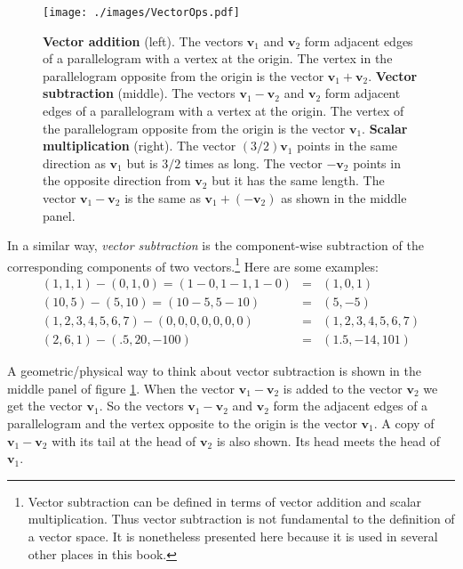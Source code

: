 \begin{figure}[h]
\centering
\texttt{[image: ./images/VectorOps.pdf]}
\caption[Scott Hotton]{{\bf Vector addition} (left). The vectors $\mathbf{v}_1$ 
and $\mathbf{v}_2$ form adjacent edges of a parallelogram with a vertex at the
origin. The vertex in the parallelogram opposite from the origin is the 
vector $\mathbf{v}_1 + \mathbf{v}_2$. {\bf Vector subtraction} (middle). The 
vectors $\mathbf{v}_1 - \mathbf{v}_2$ and $\mathbf{v}_2$ form adjacent edges of
a parallelogram with a vertex at the origin. The vertex of the parallelogram 
opposite from the origin is the vector $\mathbf{v}_1$. {\bf Scalar 
multiplication} (right). The vector $(3/2)\mathbf{v}_1$ points in the same
direction as $\mathbf{v}_1$ but is $3/2$ times as long. The vector 
$-\mathbf{v}_2$ points in the opposite direction from $\mathbf{v}_2$ but
it has the same length. The vector $\mathbf{v}_1 - \mathbf{v}_2$ is the
same as $\mathbf{v}_1 + (-\mathbf{v}_2)$ as shown in the middle panel.}
\label{vectorMath}
\end{figure}

   In a similar way, \emph{vector subtraction} is the component-wise 
subtraction of the corresponding components of two vectors.\footnote{Vector 
subtraction can be defined in terms of vector addition and scalar 
multiplication. Thus vector subtraction is not fundamental to the definition 
of a vector space. It is nonetheless presented here because it is used in 
several other places in this book.}  Here are some examples:
\begin{eqnarray*}
(1,1,1) - (0,1,0) = (1-0,1-1,1-0) &=& (1,0,1) \\
(10,5) - (5,10) = (10-5,5-10) &=& (5,-5) \\
(1,2,3,4,5,6,7) - (0,0,0,0,0,0,0) &=& (1,2,3,4,5,6,7) \\
(2,6,1) - (.5,20,-100) &=& (1.5,-14,101)
\end{eqnarray*}

   A geometric/physical way to think about vector subtraction is shown in the 
middle panel of figure \ref{vectorMath}. When the vector $\mathbf{v}_1 - 
\mathbf{v}_2$ is added to the vector $\mathbf{v}_2$ we get the vector 
$\mathbf{v}_1$. So the vectors $\mathbf{v}_1 - \mathbf{v}_2$ and 
$\mathbf{v}_2$ form the adjacent edges of a parallelogram and the vertex opposite
to the origin is the vector $\mathbf{v}_1$. A copy of $\mathbf{v}_1 - 
\mathbf{v}_2$ with its tail at the head of $\mathbf{v}_2$ is also shown. Its
head meets the head of $\mathbf{v}_1$.

